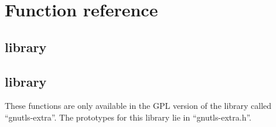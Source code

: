 \chapter{Function reference}

\section{\gnutls{} library}


\newpage

\section{\gnutlse{} library}
These functions are only available in the GPL version of the
library called ``gnutls-extra''. The prototypes for this library lie
in ``gnutls-extra.h''.



